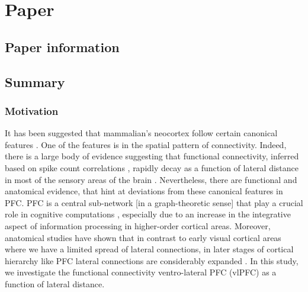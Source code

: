\chapter{Paper } \label{cha:paper-safavi2018}

\section*{Paper information} %



\section*{Summary} %
\subsection*{Motivation}

It has been suggested that mammalian's neocortex follow certain canonical features
\cite{douglasCanonicalMicrocircuitNeocortex1989,douglasNeuronalCircuitsNeocortex2004,douglasMappingMatrixWays2007,harrisCorticalConnectivitySensory2013}.
One of the features is in the spatial pattern of connectivity.
Indeed, there is a large body of evidence suggesting that functional connectivity, inferred based on spike count correlations \cite{cohenMeasuringInterpretingNeuronal2011},
rapidly decay as a function of lateral distance in most of the sensory areas of the brain
\cite{constantinidisCorrelatedDischargesPutative2002,rothschildFunctionalOrganizationPopulation2010,cohenMeasuringInterpretingNeuronal2011,smithSpatialTemporalScales2008a,smithSpatialTemporalScales2013a,denmanStructurePairwiseCorrelation2014}.
Nevertheless, there are functional and anatomical evidence,
that hint at deviations from these canonical features in PFC.
PFC is a central sub-network [in a graph-theoretic sense]  \cite{modhaNetworkArchitectureLongdistance2010} that play a crucial role in cognitive computations \citep{millerIntegrativeTheoryPrefrontal2001},
especially due to an increase in the integrative aspect of information processing in higher-order cortical areas.
Moreover, anatomical studies have shown that in contrast to early visual cortical areas
where we have a limited spread of lateral connections, in later stages of cortical hierarchy like PFC
\cite{amirCorticalHierarchyReflected1993,kritzerIntrinsicCircuitOrganization1995,angelucciCircuitsLocalGlobal2002,tanigawaOrganizationHorizontalAxons2005,vogesModelerViewSpatial2010}
lateral connections are considerably expanded 
\cite{levittTopographyPyramidalNeuron1993,amirCorticalHierarchyReflected1993,lundComparisonIntrinsicConnectivity1993,kritzerIntrinsicCircuitOrganization1995,fujitaIntrinsicConnectionsMacaque1996,tanigawaOrganizationHorizontalAxons2005}.
In this study, we investigate the functional connectivity ventro-lateral PFC (vlPFC) as a function of lateral distance.

